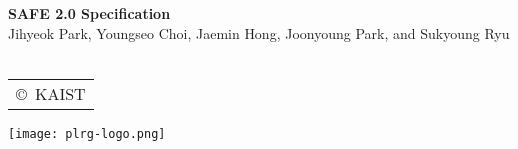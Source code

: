 \documentclass[oneside,openany,a4paper,10pt]{book}
\begin{document}
\begin{titlepage}
    \vspace*{15em}
    \centering
    {\bfseries\Huge
        SAFE 2.0 Specification\\
    }    
        \vskip2cm
       {\Large
 Jihyeok Park, Youngseo Choi, Jaemin Hong, Joonyoung Park, and Sukyoung Ryu}\\
~\\
\large
\begin{tabular}{c}
                        \copyright\ KAIST
\end{tabular}
\texttt{[image: plrg-logo.png]}
\end{titlepage}

\tableofcontents

\newpage
\multibegin
\raggedcolumns







\normalsize



\multiend
\end{document}
